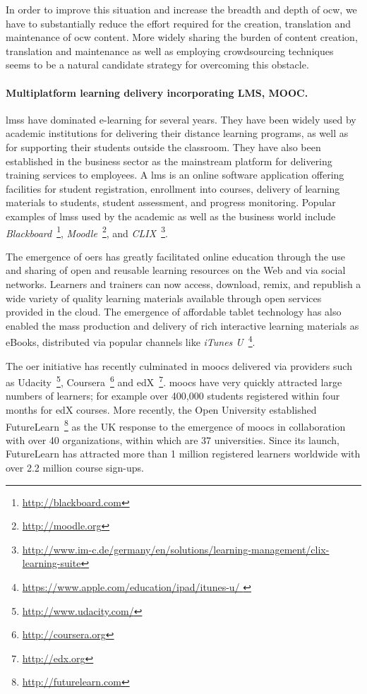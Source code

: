 \documentclass[PhD, Submit, ngerman,UKenglish,table]{scrbook}
\begin{document}
In order to improve this situation and increase the breadth and depth of \gls{ocw}, we have to substantially reduce the effort required for the creation, translation and maintenance of \gls{ocw} content.
More widely sharing the burden of content creation, translation and maintenance as well as employing crowdsourcing techniques seems to be a natural candidate strategy for overcoming this obstacle.

\paragraph{Multiplatform learning delivery incorporating LMS, MOOC.}
\gls{lms}s have dominated e-learning for several years.
They have been widely used by academic institutions for delivering their distance learning programs, as well as for supporting their students outside the classroom.
They have also been established in the business sector as the mainstream platform for delivering training services to employees.
A \gls{lms} is an online software application offering facilities for student registration, enrollment into courses, delivery of learning materials to students, student assessment, and progress monitoring.
Popular examples of \gls{lms}s used by the academic as well as the business world include \emph{Blackboard}~\footnote{\url{http://blackboard.com}}, \emph{Moodle}~\footnote{\url{http://moodle.org}}, and \emph{CLIX}~\footnote{\url{http://www.im-c.de/germany/en/solutions/learning-management/clix-learning-suite}}.

The emergence of \gls{oer}s has greatly facilitated online education through the use and sharing of open and reusable learning resources on the Web and via social networks.
Learners and trainers can now access, download, remix, and republish a wide variety of quality learning materials available through open services provided in the cloud.
The emergence of affordable tablet technology has also enabled the mass production and delivery of rich interactive learning materials as eBooks, distributed via popular channels like \emph{iTunes U}~\footnote{\url{https://www.apple.com/education/ipad/itunes-u/ }}.

The \gls{oer} initiative has recently culminated in \gls{mooc}s delivered via providers such as Udacity~\footnote{\url{http://www.udacity.com/}}, Coursera~\footnote{\url{http://coursera.org}} and edX~\footnote{\url{http://edx.org}}.
\gls{mooc}s have very quickly attracted large numbers of learners; for example over 400,000 students registered within four months for edX courses.
More recently, the Open University established FutureLearn~\footnote{\url{http://futurelearn.com}} as the UK response to the emergence of \gls{mooc}s in collaboration with over 40 organizations, within which are 37 universities.
Since its launch, FutureLearn has attracted more than 1 million registered learners worldwide with over 2.2 million course sign-ups. 
\end{document}
